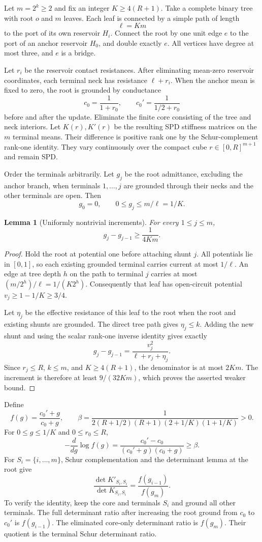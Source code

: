 \documentclass[11pt]{article}
\newtheorem{lemma}[theorem]{Lemma}
\begin{document}
Let $m=2^k\ge2$ and fix an integer $K\ge4(R+1)$. Take a complete
binary tree with root $o$ and $m$ leaves. Each leaf is connected by a
simple path of length
\[
 \ell=Km
\]
to the port of its own reservoir $H_i$. Connect the root by one unit
edge $e$ to the port of an anchor reservoir $H_0$, and double exactly
$e$. All vertices have degree at most three, and $e$ is a bridge.

Let $r_i$ be the reservoir contact resistances. After eliminating
mean-zero reservoir coordinates, each terminal neck has resistance
$\ell+r_i$. When the anchor mean is fixed to zero, the root is
grounded by conductance
\[
 c_0=\frac1{1+r_0},\qquad
 c_0'=\frac1{1/2+r_0}
\]
before and after the update. Eliminate the finite core consisting of
the tree and neck interiors. Let $K(r),K'(r)$ be the resulting SPD
stiffness matrices on the $m$ terminal means. Their difference is
positive rank one by the Schur-complement rank-one identity. They vary
continuously over the compact cube $r\in[0,R]^{m+1}$ and remain SPD.

Order the terminals arbitrarily. Let $g_j$ be the root admittance,
excluding the anchor branch, when terminals $1,\ldots,j$ are grounded
through their necks and the other terminals are open. Then
\[
 g_0=0,\qquad 0\le g_j\le m/\ell=1/K.
\]

\begin{lemma}[Uniformly nontrivial increments]\label{lem:increments}
For every $1\le j\le m$,
\[
 g_j-g_{j-1}\ge\frac1{4Km}.
\]
\end{lemma}
\begin{proof}
Hold the root at potential one before attaching shunt $j$.
All potentials lie in $[0,1]$, so each existing grounded terminal
carries current at most $1/\ell$. An edge at tree depth $h$ on the
path to terminal $j$ carries at most
$(m/2^h)/\ell=1/(K2^h)$. Consequently that leaf has open-circuit
potential $v_j\ge1-1/K\ge3/4$.

Let $\eta_j$ be the effective resistance of this leaf to the root
when the root and existing shunts are grounded. The direct tree path
gives $\eta_j\le k$. Adding the new shunt and using the scalar
rank-one inverse identity gives exactly
\[
 g_j-g_{j-1}=\frac{v_j^2}{\ell+r_j+\eta_j}.
\]
Since $r_j\le R$, $k\le m$, and $K\ge4(R+1)$, the denominator is
at most $2Km$. The increment is therefore at least $9/(32Km)$,
which proves the asserted weaker bound.
\end{proof}

Define
\[
 f(g)=\frac{c_0'+g}{c_0+g},\qquad
 \beta=\frac{1}{2(R+1/2)(R+1)(2+1/K)(1+1/K)}>0.
\]
For $0\le g\le1/K$ and $0\le r_0\le R$,
\[
 -\frac{d}{dg}\log f(g)
 =\frac{c_0'-c_0}{(c_0'+g)(c_0+g)}\ge\beta.
\]
For $S_i=\{i,\ldots,m\}$, Schur complementation and the determinant
lemma at the root give
\[
 \frac{\det K'_{S_i,S_i}}{\det K_{S_i,S_i}}
                  =\frac{f(g_{i-1})}{f(g_m)}.
\]
To verify the identity, keep the core and terminals $S_i$ and ground
all other terminals. The full determinant ratio after increasing the
root ground from $c_0$ to $c_0'$ is $f(g_{i-1})$. The eliminated
core-only determinant ratio is $f(g_m)$. Their quotient is the
terminal Schur determinant ratio.
\end{document}

